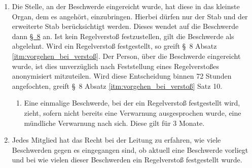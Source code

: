 \begin{enumerate}[label=(\arabic*)]
\begin{enumerate}[label=(\Alph*)]
        \item Richtet sich die Beschwerde gegen den Unit-Leiter, oder den Spieß, so sind diese beiden Stellen zu überspringen. Vor der öffentlichen Konfrontation gegenüber der entsprechenden Person während einer Nachbesprechung, oder während der Mitgliederversammlung, ist der S1-Feldwebel die höchste anzurufende Stelle, bei Beschwerden solcher Art. Ist der Posten des S1-Feldwebels nicht besetzt, so kann neben dem Gefreiten vom Dienst (GvD) zusätzlich der Unteroffizier vom Dienst (UvD) angerufen werden. Die öffentliche Konfrontation gegenüber der entsprechenden Person während einer Nachbesprechung, oder während der Mitgliederversammlung kann in einem solchen Fall, auch ohne vorheriges Durchlaufen aller Stellen, ergriffen werden. Richtet sich die Beschwerde gegen eine andere Person, die einen der Posten aus \S~8a Absatz 4A inne hat, aber nicht den Posten Unit-Leiter, oder Spieß, so wird diese Stelle übersprungen.
    \end{enumerate}    
    \item Die Stelle, an der Beschwerde eingereicht wurde, hat diese in das kleinste Organ, dem es angehört, einzubringen. Hierbei dürfen nur der Stab und der erweiterte Stab berücksichtigt werden. Dieses wendet auf die Beschwerde dann \hyperref[sec:umgang_mit_regelverstoeßen]{\S~8} an. Ist kein Regelverstoß festzustellen, gilt die Beschwerde als abgelehnt. Wird ein Regelverstoß festgestellt, so greift \S~8 Absatz \ref{itm:vorgehen_bei_verstoß}. Der Person, über die Beschwerde eingereicht wurde, ist dies unverzüglich nach Feststellung eines Regelverstoßes anonymisiert mitzuteilen. Wird diese Entscheidung binnen 72 Stunden angefochten, greift \S~8 Absatz \ref{itm:vorgehen_bei_verstoß} Satz 10.
    \begin{enumerate}[label=(\Alph*)]
        \item Eine einmalige Beschwerde, bei der ein Regelverstoß festgestellt wird, zieht, sofern nicht bereits eine Verwarnung ausgesprochen wurde, eine mündliche Verwarnung nach sich. Diese gilt für 3 Monate.
    \end{enumerate}    
    \item Jedes Mitglied hat das Recht bei der Leitung zu erfahren, wie viele Beschwerden gegen es eingegangen sind, ob aktuell eine Beschwerde vorliegt und bei wie vielen dieser Beschwerden ein Regelverstoß festgestellt wurde.
\end{enumerate}
